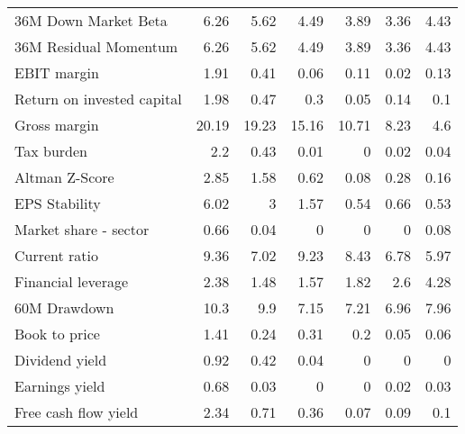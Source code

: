 \begin{tabular}{lrrrrrr}
 36M Down Market Beta                &        6.26 &        5.62 &        4.49 &        3.89 &        3.36 &        4.43 \\
 36M Residual Momentum               &        6.26 &        5.62 &        4.49 &        3.89 &        3.36 &        4.43 \\
 EBIT margin                         &        1.91 &        0.41 &        0.06 &        0.11 &        0.02 &        0.13 \\
 Return on invested capital          &        1.98 &        0.47 &        0.3  &        0.05 &        0.14 &        0.1  \\
 Gross margin                        &       20.19 &       19.23 &       15.16 &       10.71 &        8.23 &        4.6  \\
 Tax burden                          &        2.2  &        0.43 &        0.01 &        0    &        0.02 &        0.04 \\
 Altman Z-Score                      &        2.85 &        1.58 &        0.62 &        0.08 &        0.28 &        0.16 \\
 EPS Stability                       &        6.02 &        3    &        1.57 &        0.54 &        0.66 &        0.53 \\
 Market share - sector               &        0.66 &        0.04 &        0    &        0    &        0    &        0.08 \\
 Current ratio                       &        9.36 &        7.02 &        9.23 &        8.43 &        6.78 &        5.97 \\
 Financial leverage                  &        2.38 &        1.48 &        1.57 &        1.82 &        2.6  &        4.28 \\
 60M Drawdown                        &       10.3  &        9.9  &        7.15 &        7.21 &        6.96 &        7.96 \\
 Book to price                       &        1.41 &        0.24 &        0.31 &        0.2  &        0.05 &        0.06 \\
 Dividend yield                      &        0.92 &        0.42 &        0.04 &        0    &        0    &        0    \\
 Earnings yield                      &        0.68 &        0.03 &        0    &        0    &        0.02 &        0.03 \\
 Free cash flow yield                &        2.34 &        0.71 &        0.36 &        0.07 &        0.09 &        0.1  \\

\end{tabular}
